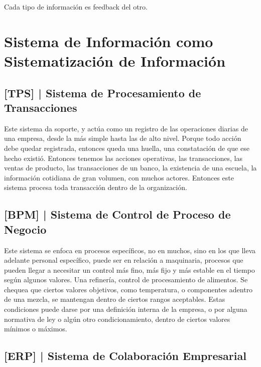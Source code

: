Cada tipo de información es feedback del otro.

\hypertarget{sistema-de-informaciuxf3n-como-sistematizaciuxf3n-de-informaciuxf3n-6}{%
\section{Sistema de Información como Sistematización de Información}\label{sistema-de-informaciuxf3n-como-sistematizaciuxf3n-de-informaciuxf3n-6}}

\hypertarget{sistema-de-procesamiento-de-transacciones-tps}{%
\subsection{%
{[}TPS{]} |
Sistema de Procesamiento de Transacciones
}\label{sistema-de-procesamiento-de-transacciones-tps}}

Este sistema da soporte, y actúa como un registro de las operaciones
diarias de una empresa, desde la más simple hasta las de alto nivel.
Porque todo acción debe quedar registrada, entonces queda una huella,
una constatación de que ese hecho existió. Entonces tenemos las acciones
operativas, las transacciones, las ventas de producto, las transacciones
de un banco, la existencia de una escuela, la información cotidiana de
gran volumen, con muchos actores. Entonces este sistema procesa toda
transacción dentro de la organización.

\hypertarget{sistema-de-control-de-proceso-de-negocio-bpm}{%
\subsection{%
{[}BPM{]} |
Sistema de Control de Proceso de Negocio
}\label{sistema-de-control-de-proceso-de-negocio-bpm}}

Este sistema se enfoca en procesos específicos, no en muchos, sino en
los que lleva adelante personal específico, puede ser en relación a
maquinaria, procesos que pueden llegar a necesitar un control más fino,
más fijo y más estable en el tiempo según algunos valores. Una
refinería, control de procesamiento de alimentos. Se chequea que ciertos
valores objetivos, como temperatura, o componentes adentro de una
mezcla, se mantengan dentro de ciertos rangos aceptables. Estas
condiciones puede darse por una definición interna de la empresa, o por
alguna normativa de ley o algún otro condicionamiento, dentro de ciertos
valores mínimos o máximos.

\hypertarget{sistema-de-colaboraciuxf3n-empresarial-erp}{%
\subsection{%
{[}ERP{]} |
Sistema de Colaboración Empresarial
}\label{sistema-de-colaboraciuxf3n-empresarial-erp}}


